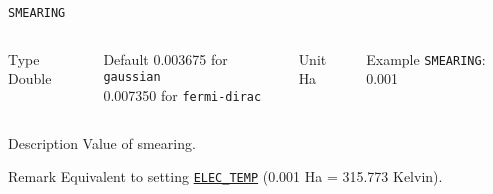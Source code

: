 \documentclass[xcolor=dvipsnames,t]{beamer}
\begin{document}
\begin{frame}[allowframebreaks]{\texttt{SMEARING}} \label{SMEARING}
\vspace*{-12pt}
\begin{columns}
\begin{block}{Type}
Double
\end{block}

\begin{block}{Default}
0.003675 for \texttt{gaussian} \\
0.007350 for \texttt{fermi-dirac}
\end{block}

\begin{block}{Unit}
Ha
\end{block}

\begin{block}{Example}
\texttt{SMEARING}: 0.001
\end{block}
\end{columns}

\begin{block}{Description}
Value of smearing.
\end{block}

\begin{block}{Remark}
Equivalent to setting \hyperlink{ELEC_TEMP}{\texttt{ELEC\_TEMP}} (0.001 Ha = 315.773 Kelvin).
\end{block}

\end{frame}
\end{document}
